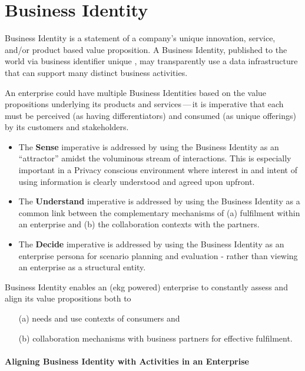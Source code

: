 \section*{Business Identity}
\label{sec:ekg-mm-business-identity}

Business Identity is a statement of a company's unique innovation, service, and/or product based value proposition.
A Business Identity, published to the world via business identifier unique ,
may transparently use a data infrastructure that can support many distinct business activities.

An enterprise could have multiple Business Identities based on the value propositions underlying its
products and services\,---\,it is imperative that each must be perceived (as having differentiators) and
consumed (as unique offerings) by its customers and stakeholders.

\begin{itemize}
    \item The \textbf{Sense} imperative is addressed by using the Business Identity as an “attractor” amidst the
          voluminous stream of interactions.
          This is especially important in a Privacy conscious environment where interest in and intent of using
          information is clearly understood and agreed upon upfront.
    \item The \textbf{Understand} imperative is addressed by using the Business Identity as a common link between the
          complementary mechanisms of (a) fulfilment within an enterprise and (b) the collaboration contexts with
          the partners.
    \item The \textbf{Decide} imperative is addressed by using the Business Identity as an enterprise persona for scenario
          planning and evaluation - rather than viewing an enterprise as a structural entity.
\end{itemize}

Business Identity enables an (\gls{ekg} powered) enterprise to constantly assess and align its value propositions
both to

\begin{itemize}
    \item[(a)] needs and use contexts of consumers and
    \item[(b)] collaboration mechanisms with business partners for effective fulfilment.
\end{itemize}

\paragraph*{Aligning Business Identity with Activities in an Enterprise}


